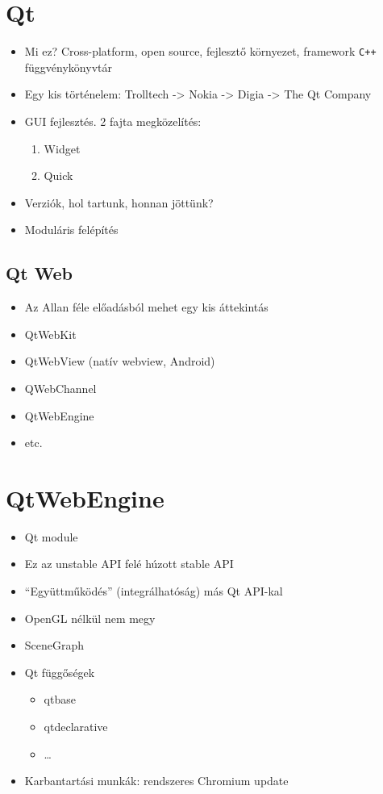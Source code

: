 \documentclass[12pt]{report}
\begin{document}
\section{Qt}
\begin{itemize}
    \item Mi ez?
        \subitem Cross-platform, open source, fejlesztő környezet, framework
        \subitem \texttt{C++} függvénykönyvtár
    \item Egy kis történelem:
        \subitem Trolltech -> Nokia -> Digia -> The Qt Company
    \item GUI fejlesztés. 2 fajta megközelítés:
        \begin{enumerate}
            \item Widget
            \item Quick
        \end{enumerate}
    \item Verziók, hol tartunk, honnan jöttünk?
    \item Moduláris felépítés
\end{itemize}

\subsection{Qt Web}
\begin{itemize}
    \item Az Allan féle előadásból mehet egy kis áttekintás
    \item QtWebKit
    \item QtWebView (natív webview, Android)
    \item QWebChannel
    \item QtWebEngine
    \item etc.
\end{itemize}

\section{QtWebEngine}
\begin{itemize}
    \item Qt module
    \item Ez az unstable API felé húzott stable API
    \item ``Együttműködés'' (integrálhatóság) más Qt API-kal
    \item OpenGL nélkül nem megy
    \item SceneGraph
    \item Qt függőségek
        \begin{itemize}
            \item qtbase
            \item qtdeclarative
            \item \dots
        \end{itemize}
    \item Karbantartási munkák: rendszeres Chromium update
\end{itemize}
\end{document}
